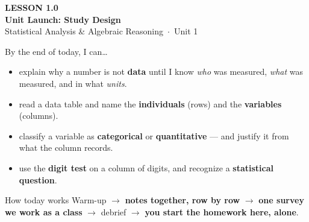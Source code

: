 \documentclass[aspectratio=169, 11pt]{beamer}
\begin{document}
{
\begin{frame}[plain]
  \vspace{2.8cm}\hspace{0.55cm}%
  \begin{minipage}{0.9\textwidth}
    {\color{goldacc}\bfseries\small LESSON 1.0}\\[0.5cm]
    {\color{white}\bfseries\LARGE Unit Launch: Study Design}\\[1.2cm]
    {\color{frostmid}\small Statistical Analysis \& Algebraic Reasoning~$\cdot$~Unit 1}
  \end{minipage}
\end{frame}
}

\begin{frame}[t, plain]
  By the end of today, I can\ldots
  \begin{itemize}\setlength{\itemsep}{5pt}
    \item explain why a number is not \textbf{data} until I know \emph{who} was measured,
          \emph{what} was measured, and in what \emph{units}.
    \item read a data table and name the \textbf{individuals} (rows) and the
          \textbf{variables} (columns).
    \item classify a variable as \textbf{categorical} or \textbf{quantitative} --- and justify
          it from what the column records.
    \item use the \textbf{digit test} on a column of digits, and recognize a
          \textbf{statistical question}.
  \end{itemize}
  \begin{block}{How today works}
    Warm-up $\to$ \textbf{notes together, row by row} $\to$ \textbf{one survey we work as a
    class} $\to$ debrief $\to$ \textbf{you start the homework here, alone}.
  \end{block}
\end{frame}
\end{document}
